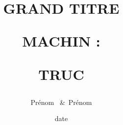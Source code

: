 \newcommand{\deffunct}[5]{%
\begin{align*}%
      #1 \colon & #2 \to #3\\
       &#4\xmapsto{\hphantom{#1}} #5
\end{align*}%
}
\newcommand{\HRule}{\rule{\paperwidth}{0.5mm}} %
\newcommand*{\theuniversity}{\'Etablissement}
\newcommand*{\theyearname}{formation, $n$\ieme~année}
\newcommand*{\thesupervisor}{Prénom \bsc{Nom}}

\author{Prénom ~\&~Prénom }
\date{date}
\title{GRAND TITRE\par
            MACHIN : \par TRUC \par}

\DeclareMathOperator{\Card}{Card} %


\setlrmargins{2.5cm}{*}{*}
\checkandfixthelayout[nearest] %
